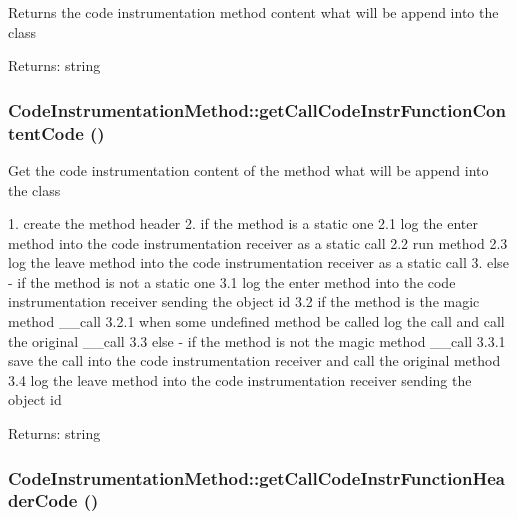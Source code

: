 Returns the code instrumentation method content what will be append into the class

\begin{Desc}
\item[Returns:]string \end{Desc}
\hypertarget{class_code_instrumentation_method_b0506c97566930831078d8c53d1b70e4}{
\subsubsection[{getCallCodeInstrFunctionContentCode}]{\setlength{\rightskip}{0pt plus 5cm}CodeInstrumentationMethod::getCallCodeInstrFunctionContentCode ()}}
\label{class_code_instrumentation_method_b0506c97566930831078d8c53d1b70e4}


Get the code instrumentation content of the method what will be append into the class

1. create the method header 2. if the method is a static one 2.1 log the enter method into the code instrumentation receiver as a static call 2.2 run method 2.3 log the leave method into the code instrumentation receiver as a static call 3. else - if the method is not a static one 3.1 log the enter method into the code instrumentation receiver sending the object id 3.2 if the method is the magic method \_\-\_\-call 3.2.1 when some undefined method be called log the call and call the original \_\-\_\-call 3.3 else - if the method is not the magic method \_\-\_\-call 3.3.1 save the call into the code instrumentation receiver and call the original method 3.4 log the leave method into the code instrumentation receiver sending the object id

\begin{Desc}
\item[Returns:]string \end{Desc}
\hypertarget{class_code_instrumentation_method_5ac76fbcfc7bfc32c63c13d9523ec5ca}{
\subsubsection[{getCallCodeInstrFunctionHeaderCode}]{\setlength{\rightskip}{0pt plus 5cm}CodeInstrumentationMethod::getCallCodeInstrFunctionHeaderCode ()}}
\label{class_code_instrumentation_method_5ac76fbcfc7bfc32c63c13d9523ec5ca}



